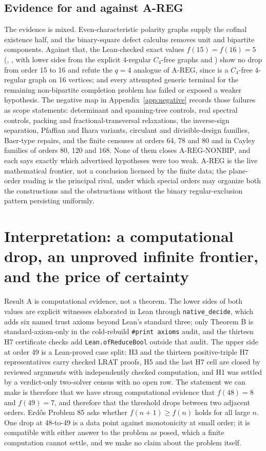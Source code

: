 \documentclass{anvil-paper}
\newcommand{\AREG}{\mathrm{A\text{-}REG}}
\newcommand{\NONBIP}{\mathrm{A\text{-}REG\text{-}NONBIP}}
\theoremstyle{definition}
\begin{document}
\subsection{Evidence for and against A-REG}\label{sec:areg-evidence}

The evidence is mixed. Even-characteristic polarity graphs supply the cofinal existence half, and the binary-square defect calculus removes unit and bipartite components. Against that, the Lean-checked exact values $f(15)=f(16)=5$ (, , with lower sides from the explicit 4-regular $C_4$-free graphs  and ) show no drop from order 15 to 16 and refute the $q=4$ analogue of $\AREG$, since  is a $C_4$-free 4-regular graph on 16 vertices; and every attempted generic terminal for the remaining non-bipartite completion problem has failed or exposed a weaker hypothesis. The negative map in Appendix~\ref{app:negative} records those failures as scope statements: determinant and spanning-tree controls, real spectral controls, packing and fractional-transversal relaxations, the inverse-sign separation, Pfaffian and Ihara variants, circulant and divisible-design families, Baer-type repairs, and the finite censuses at orders 64, 78 and 80 and in Cayley families of orders 80, 120 and 168. None of them closes $\NONBIP$, and each says exactly which advertised hypotheses were too weak. $\AREG$ is the live mathematical frontier, not a conclusion licensed by the finite data; the plane-order reading is the principal rival, under which special orders may organize both the constructions and the obstructions without the binary regular-exclusion pattern persisting uniformly.

\section{Interpretation: a computational drop, an unproved infinite frontier, and the price of certainty}\label{sec:interpretation}

Result A is computational evidence, not a theorem. The lower sides of both values are explicit witnesses elaborated in Lean through \texttt{native\_decide}, which adds six named trust axioms beyond Lean's standard three; only Theorem B is standard-axiom-only in the cold-rebuild \texttt{\#print axioms} audit, and the thirteen H7 certificate checks add \texttt{Lean.ofReduceBool} outside that audit. The upper side at order 49 is a Lean-proved case split: H3 and the thirteen positive-triple H7 representatives carry checked LRAT proofs, H5 and the last H7 cell are closed by reviewed arguments with independently checked computation, and H1 was settled by a verdict-only two-solver census with no open row. The statement we can make is therefore that we have strong computational evidence that $f(48)=8$ and $f(49)=7$, and therefore that the threshold drops between two adjacent orders. Erdős Problem 85 asks whether $f(n+1)\ge f(n)$ holds for all large $n$. One drop at 48-to-49 is a data point against monotonicity at small order; it is compatible with either answer to the problem as posed, which a finite computation cannot settle, and we make no claim about the problem itself.
\end{document}

